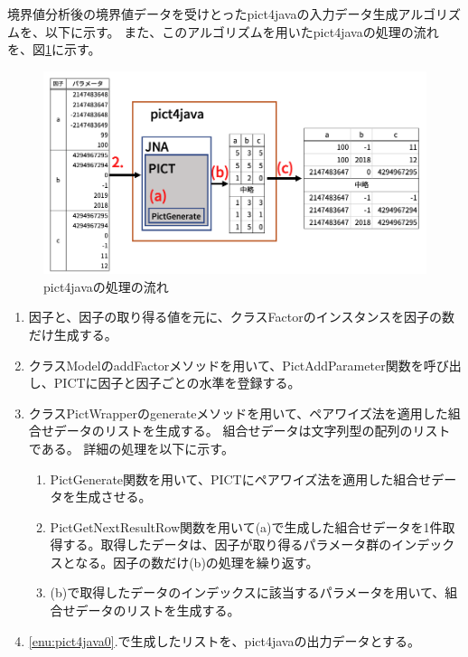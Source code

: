 \documentclass[uplatex, report, a4j, 10pt]{jsbook}
\begin{document}
境界値分析後の境界値データを受けとったpict4javaの入力データ生成アルゴリズムを、以下に示す。
また、このアルゴリズムを用いたpict4javaの処理の流れを、図\ref{fig:pict4java}に示す。

\begin{figure}[tp]
  \centering
  \includegraphics[keepaspectratio, width=160mm]{figs/pict4java}
  \caption{pict4javaの処理の流れ}
  \label{fig:pict4java}
\end{figure}

\begin{enumerate}
  \item 因子と、因子の取り得る値を元に、クラスFactorのインスタンスを因子の数だけ生成する。
  \item クラスModelのaddFactorメソッドを用いて、PictAddParameter関数を呼び出し、PICTに因子と因子ごとの水準を登録する。
  \item\label{enu:pict4java0} クラスPictWrapperのgenerateメソッドを用いて、ペアワイズ法を適用した組合せデータのリストを生成する。
        組合せデータは文字列型の配列のリストである。
        詳細の処理を以下に示す。
        \begin{enumerate}
          \item\label{enu:pict4java1} PictGenerate関数を用いて、PICTにペアワイズ法を適用した組合せデータを生成させる。
          \item\label{enu:pict4java2} PictGetNextResultRow関数を用いて(a)で生成した組合せデータを1件取得する。取得したデータは、因子が取り得るパラメータ群のインデックスとなる。因子の数だけ(b)の処理を繰り返す。
          \item (b)で取得したデータのインデックスに該当するパラメータを用いて、組合せデータのリストを生成する。
        \end{enumerate}
  \item \ref{enu:pict4java0}.で生成したリストを、pict4javaの出力データとする。
\end{enumerate}
\end{document}
